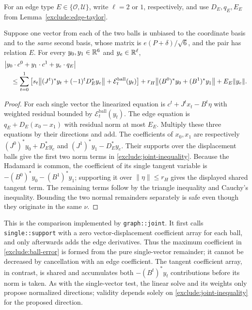 For an edge type $E\in\{\mathcal O,\mathcal U\}$, write
$\ell=2$ or $1$, respectively, and use $D_E,q_E,E_E$ from
Lemma~\ref{exclude:edge-taylor}.

\begin{lemma}
\label{exclude:joint-support}
Suppose one vector from each of the two balls is unbiased to the
coordinate basis and to the \emph{same} second basis, whose matrix is
$e(P+\delta)/\sqrt6$, and the pair has relation $E$.
For every $y_0,y_1\in\mathbb R^6$ and $y_e\in\mathbb R^\ell$,
\begin{align}
 &\bigl|y_0\cdot c^0+y_1\cdot c^1+y_e\cdot q_E\bigr|\notag\\
 &\quad\le
 \sum_{t=0}^1\left[
   s_t\bigl\|(J^t)^*y_t+(-1)^tD_E^*y_e\bigr\|
   +\mathcal E_t^{\mathrm{ball}}(y_t)\right]
 +r_H\bigl\|(B^0)^*y_0+(B^1)^*y_1\bigr\|
 +E_E\|y_e\|.
 \label{exclude:joint-inequality}
\end{align}
\end{lemma}
\begin{proof}
For each single vector the linearized equation is
$c^t+J^tx_t-B^t\eta$ with weighted residual bounded by
$\mathcal E_t^{\mathrm{ball}}(y_t)$.
The edge equation is $q_E+D_E(x_0-x_1)$ with residual norm at most
$E_E$.
Multiply these three equations by their directions and add.
The coefficients of $x_0,x_1$ are respectively
$(J^0)^*y_0+D_E^*y_e$ and $(J^1)^*y_1-D_E^*y_e$.
Their supports over the displacement balls give the first two norm
terms in \eqref{exclude:joint-inequality}.
Because the Hadamard is common, the coefficient of its single
tangent variable is
$-(B^0)^*y_0-(B^1)^*y_1$; supporting it over $\|\eta\|\le r_H$
gives the displayed shared tangent term.
The remaining terms follow by the triangle inequality and Cauchy's
inequality.  Bounding the two normal remainders separately is safe
even though they originate in the same $\nu$.
\end{proof}

This is the comparison implemented by \texttt{graph::joint}.
It first calls \texttt{single::support} with a zero vector-displacement
coefficient array for each ball, and only afterwards adds the edge
derivatives.  Thus the maximum coefficient in
\eqref{exclude:ball-error} is formed from the pure single-vector
remainder; it cannot be decreased by cancellation with an edge
coefficient.  The tangent coefficient array, in contrast, is shared
and accumulates both $-(B^t)^*y_t$ contributions before its norm is taken.
As with the single-vector test, the linear solve and its weights only
propose normalized directions; validity depends solely on
\eqref{exclude:joint-inequality} for the proposed direction.

